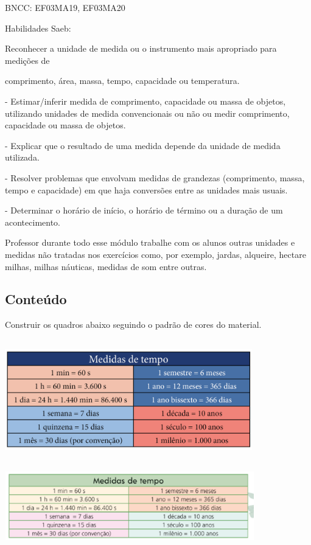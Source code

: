 BNCC: EF03MA19, EF03MA20

Habilidades Saeb:

Reconhecer a unidade de medida ou o instrumento mais apropriado para
medições de

comprimento, área, massa, tempo, capacidade ou temperatura.

- Estimar/inferir medida de comprimento, capacidade ou massa de objetos,
utilizando unidades de medida convencionais ou não ou medir comprimento,
capacidade ou massa de objetos.

- Explicar que o resultado de uma medida depende da unidade de medida
utilizada.

- Resolver problemas que envolvam medidas de grandezas (comprimento,
massa, tempo e capacidade) em que haja conversões entre as unidades mais
usuais.

- Determinar o horário de início, o horário de término ou a duração de
um acontecimento.

Professor durante todo esse módulo trabalhe com os alunos outras
unidades e medidas não tratadas nos exercícios como, por exemplo,
jardas, alqueire, hectare milhas, milhas náuticas, medidas de som entre
outras.

\subsection{Conteúdo}\label{conteuxfado-3}

Construir os quadros abaixo seguindo o padrão de cores do material.

\includegraphics[width=4.23370in,height=2.06685in]{media/image39.png}

\includegraphics[width=4.25870in,height=1.18344in]{media/image40.png}

